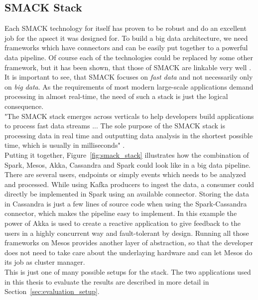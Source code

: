 \subsection{SMACK Stack}
Each SMACK technology for itself has proven to be robust and do an excellent job for the apsect it was designed for.
To build a big data architecture, we need frameworks which have connectors and can be easily put together to a powerful data pipeline.
Of course each of the technologies could be replaced by some other framework, but it has been shown, that those of SMACK are linkable very well \cite{estrada2016big}.\\
It is important to see, that SMACK focuses on \textit{fast data} and not necessarily only on \textit{big data}.
As the requirements of most modern large-scale applications demand processing in almost real-time, the need of such a stack is just the logical consequence.\\
"The SMACK stack emerges across verticals to help developers build applications to process fast data streams ...
The sole purpose of the SMACK stack is processing data in real time and outputting data analysis in the shortest possible time, which is usually in milliseconds" \cite{estrada2016big}.\\

Putting it together, Figure~\ref{fig:smack_stack} illustrates how the combination of Spark, Mesos, Akka, Cassandra and Spark could look like in a big data pipeline.
There are several users, endpoints or simply events which needs to be analyzed and processed.
While using Kafka producers to ingest the data, a consumer could directly be implemented in Spark using an available connector.
Storing the data in Cassandra is just a few lines of source code when using the Spark-Cassandra connector, which makes the pipeline easy to implement.
In this example the power of Akka is used to create a reactive application to give feedback to the users in a highly concurrent way and fault-tolerant by design.
Running all those frameworks on Mesos provides another layer of abstraction, so that the developer does not need to take care about the underlaying hardware and can let Mesos do its job as cluster manager.\\
This is just one of many possible setups for the stack.
The two applications used in this thesis to evaluate the results are described in more detail in Section~\ref{sec:evaluation_setup}.\\


